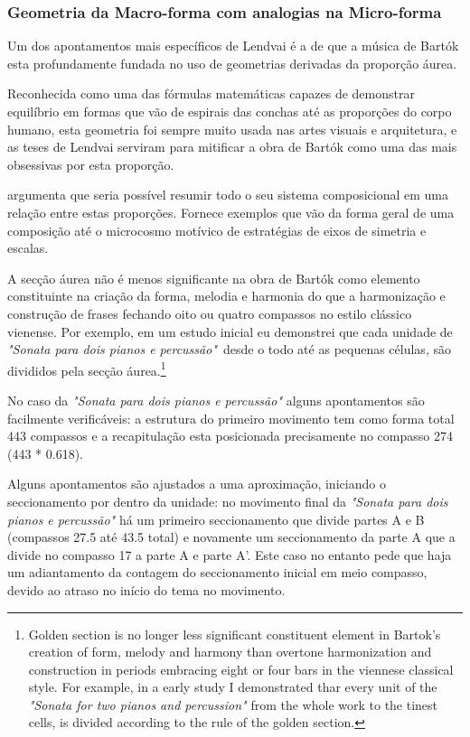\documentclass[
	12pt,				%
	openright,			%
	twoside,			%
	a4paper,			%
	english,			%
	french,				%
	spanish,			%
	brazil				%
	]{abntex2}
\begin{document}
\pagebreak
\subsubsection{Geometria da Macro-forma com analogias na Micro-forma}

Um dos apontamentos mais específicos de Lendvai é a de que a música de Bartók esta profundamente fundada no uso de geometrias derivadas da proporção áurea. 

Reconhecida como uma das fórmulas matemáticas capazes de demonstrar equilíbrio em formas que vão de espirais das conchas até as proporções do corpo humano, esta geometria foi sempre muito usada nas artes visuais e arquitetura, e as teses de Lendvai serviram para mitificar a obra de Bartók como uma das mais obsessivas por esta proporção.

 argumenta que seria possível resumir todo o seu sistema composicional em uma relação entre estas proporções. Fornece exemplos que vão da forma geral de uma composição até o microcosmo motívico de estratégias de eixos de simetria e escalas.


\begin{citacao}
A secção áurea não é menos significante na obra de Bartók como elemento constituinte na criação da forma, melodia e harmonia do que a harmonização e construção de frases fechando oito ou quatro compassos no estilo clássico vienense.
Por exemplo, em um estudo inicial eu demonstrei que cada unidade de \textit{"Sonata para dois pianos e percussão"}\ desde o todo até as pequenas células, são divididos pela secção áurea.\cite[p. 175]{lendvai1962duality}\footnote{
Golden section is no longer less significant constituent element in Bartok's creation of form, melody and harmony than overtone harmonization and construction in periods embracing eight or four bars in the viennese classical style. For example, in a early study I demonstrated thar every unit of the \textit{"Sonata for two pianos and percussion"} from the whole work to the tinest cells, is divided according to the rule of the golden section.\cite[p. 175]{lendvai1962duality}}
\end{citacao}

No caso da \textit{"Sonata para dois pianos e percussão"} alguns apontamentos são facilmente verificáveis: a estrutura do primeiro movimento tem como forma total 443 compassos e a recapitulação esta posicionada precisamente no compasso 274 (443 * 0.618).

Alguns apontamentos são ajustados a uma aproximação, iniciando o seccionamento por dentro da unidade: no movimento final da \textit{"Sonata para dois pianos e percussão"} há um primeiro seccionamento que divide partes A e B (compassos 27.5 até 43.5 total) e novamente um seccionamento da parte A que a divide no compasso 17 a parte A e parte A'. Este caso no entanto pede que haja um adiantamento da contagem do seccionamento inicial em meio compasso, devido ao atraso no início do tema no movimento.
\end{document}
